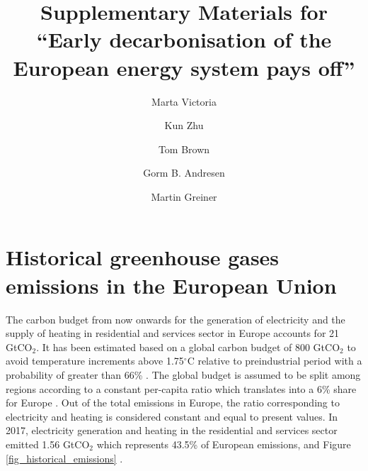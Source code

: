 \documentclass[3p]{elsarticle} %
\begin{document}
\begin{frontmatter}

\title{Supplementary Materials for ``Early decarbonisation of the European energy system pays off'' }

\author[mymainaddress,iClimate]{Marta Victoria}
\author[mymainaddress]{Kun Zhu}
\author[kitaddress]{Tom Brown}
\author[mymainaddress,iClimate]{Gorm B. Andresen}
\author[mymainaddress,iClimate]{Martin Greiner}
\address[mymainaddress]{Department of Engineering, Aarhus University, Inge Lehmanns Gade 10, 8000 Aarhus, Denmark}
\address[iClimate]{iCLIMATE Interdisciplinary Centre for Climate Change, Aarhus University}
\address[kitaddress]{Institute for Automation and Applied Informatics (IAI), Karlsruhe Institute of Technology (KIT), Forschungszentrum 449, 76344, Eggenstein-Leopoldshafen, Germany}








\end{frontmatter}

\section{Historical greenhouse gases emissions in the European Union}

The carbon budget from now onwards for the generation of electricity and the supply of heating in residential and services sector in Europe accounts for 21 GtCO$_2$. It has been estimated based on a global carbon budget of 800 GtCO$_2$ to avoid temperature increments above 1.75$^{\circ}$C relative to preindustrial period with a probability of greater than 66\% \cite{IPCC_1.5}. The global budget is assumed to be split among regions according to a constant per-capita ratio which translates into a 6\% share for Europe \cite{Raupach_2014}. Out of the total emissions in Europe, the ratio corresponding to electricity and heating is considered constant and equal to present values. In 2017, electricity generation and heating in the residential and services sector emitted 1.56 GtCO$_2$ which represents 43.5\% of European emissions,  \cite{UNFCCC_inventory} and Figure \ref{fig_historical_emissions} . \\
\end{document}
